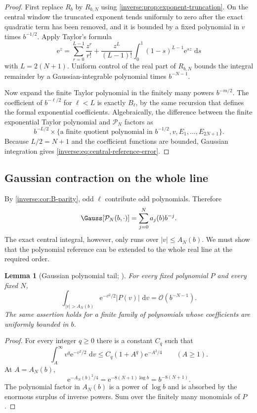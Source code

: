 \documentclass[11pt,oneside]{article}
\newtheorem{lemma}[lemma]{Lemma}
\theoremstyle{definition}
\theoremstyle{remark}
\newcommand{\e}{\mathrm e}
\newcommand{\dd}{\,\mathrm d}
\newcommand{\bigO}{\mathcal O}
\begin{document}
\begin{proof}
First replace $R_b$ by $R_{b,N}$ using
\cref{inverse:prop:exponent-truncation}.  On the central window the truncated
exponent tends uniformly to zero after the exact quadratic term has been
removed, and it is bounded by a fixed polynomial in $v$ times
$b^{-1/2}$.  Apply Taylor's formula
\[
 \e^z=\sum_{r=0}^{L-1}\frac{z^r}{r!}
      +\frac{z^L}{(L-1)!}\int_0^1(1-s)^{L-1}\e^{sz}\,\dd s
\]
with $L=2(N+1)$.  Uniform control of the real part of $R_{b,N}$ bounds the
integral remainder by a Gaussian-integrable polynomial times
$b^{-N-1}$.

Now expand the finite Taylor polynomial in the finitely many powers
$b^{-m/2}$.  The coefficient of $b^{-\ell/2}$ for
$\ell<L$ is exactly $B_\ell$, by the same recursion that defines the
formal exponential coefficients.  Algebraically, the difference between
the finite exponential Taylor polynomial and
$\mathcal P_N$ factors as
\[
 b^{-L/2}\times
 \{\text{a finite quotient polynomial in }b^{-1/2},v,
   E_1,\dots,E_{2N+1}\}.
\]
Because $L/2=N+1$ and the coefficient functions are bounded, Gaussian
integration gives \eqref{inverse:eq:central-reference-error}.
\end{proof}

\subsection{Gaussian contraction on the whole line}

By \cref{inverse:cor:B-parity}, odd $\ell$ contribute odd polynomials.  Therefore
\begin{equation}
 \Gauss[\mathcal P_N(b,\cdot)]
 =\sum_{j=0}^{N}a_j(b)b^{-j}. \label{inverse:eq:reference-contraction}
\end{equation}
The exact central integral, however, only runs over
$|v|\leq A_N(b)$.  We must show that the polynomial reference can be
extended to the whole real line at the required order.

\begin{lemma}[Gaussian polynomial tail; \Formalized]
\label{inverse:lem:gaussian-polynomial-tail}
For every fixed polynomial $P$ and every fixed $N$,
\[
 \int_{|v|>A_N(b)}\e^{-v^2/2}|P(v)|\,\dd v
 =\bigO(b^{-N-1}).
\]
The same assertion holds for a finite family of polynomials whose
coefficients are uniformly bounded in $b$.
\end{lemma}

\begin{proof}
For every integer $q\geq0$ there is a constant $C_q$ such that
\[
 \int_A^\infty v^q\e^{-v^2/2}\,\dd v
 \leq C_q(1+A^q)\e^{-A^2/4}
 \qquad(A\geq1).
\]
At $A=A_N(b)$,
\[
 \e^{-A_N(b)^2/4}
 =\e^{-8(N+1)\log b}
 =b^{-8(N+1)}.
\]
The polynomial factor in $A_N(b)$ is a power of $\log b$ and is absorbed
by the enormous surplus of inverse powers.  Sum over the finitely many
monomials of $P$.
\end{proof}
\end{document}

